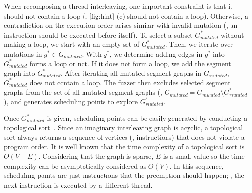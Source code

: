 When recomposing a thread interleaving, one important constraint is
that it should not contain a loop (\ie, \autoref{fig:hint}-(c) should
not contain a loop). Otherwise, a contradiction on the execution order
arises similar with invalid mutation (\ie, an instruction should be
executed before itself).
%
To select a subset $G^*_{mutated}$ without making a loop, we start
with an empty set of $G^*_{mutated}$. Then, we iterate over mutations
in $g^* \in G_{mutated}$. With $g^*$, we determine adding edges in
$g^*$ into $G^*_{mutated}$ forms a loop or not. If it does not form a
loop, we add the segment graph into $G^*_{mutated}$.
%
After iterating all mutated segment graphs in $G_{mutated}$,
$G^*_{mutated}$ does not contain a loop. The fuzzer then excludes
selected segment graphs from the set of all mutated segment graphs
(\ie, $G_{mutated} = G_{mutated} \setminus G^*_{mutated}$), and
generates scheduling points to explore $G^*_{mutated}$.












%
Once $G^{*}_{mutated}$ is given, scheduling points can be easily
generated by conducting a topological sort~\cite{topologicalsort}.
%
Since an imaginary interleaving graph is acyclic, a topological sort
always returns a sequence of vertices (\ie, instructions) that does
not violate a program order.
%
It is well known that the time complexity of a topological sort is
$O(V+E)$. Considering that the graph is sparse, $E$ is a small value
so the time complexity can be asymptotically considered as $O(V)$.
%
In this sequence, scheduling points are just instructions that the
preemption should happen; \ie, the next instruction is executed by a
different thread.




